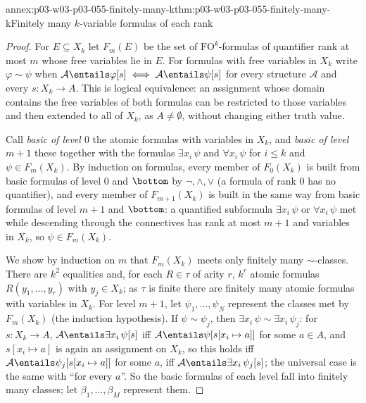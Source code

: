 \begin{annexitem}{annex:p03-w03-p03-055-finitely-many-k}{thm:p03-w03-p03-055-finitely-many-k}{Finitely many \(k\)-variable formulas of each rank}
\begin{proof}
For \(E\subseteq X_k\) let \(F_m(E)\) be the set of
\(\mathrm{FO}^k\)-formulas of quantifier rank at most \(m\) whose free
variables lie in \(E\). For formulas with free variables in \(X_k\) write
\(\varphi\sim\psi\) when \(\mathcal A\entails\varphi[s]\iff
\mathcal A\entails\psi[s]\) for every structure \(\mathcal A\) and every
\(s\colon X_k\to A\). This is logical equivalence: an assignment whose
domain contains the free variables of both formulas can be restricted to
those variables and then extended to all of \(X_k\), as \(A\neq\emptyset\),
without changing either truth value.

Call \emph{basic of level \(0\)} the atomic formulas with variables in
\(X_k\), and \emph{basic of level \(m+1\)} these together with the formulas
\(\exists x_i\,\psi\) and \(\forall x_i\,\psi\) for \(i\le k\) and
\(\psi\in F_m(X_k)\). By induction on formulas, every member of
\(F_0(X_k)\) is built from basic formulas of level \(0\) and \(\bottom\) by
\(\neg,\wedge,\vee\) (a formula of rank \(0\) has no quantifier), and every
member of \(F_{m+1}(X_k)\) is built in the same way from basic formulas of
level \(m+1\) and \(\bottom\): a quantified subformula
\(\exists x_i\,\psi\) or \(\forall x_i\,\psi\) met while descending through
the connectives has rank at most \(m+1\) and variables in \(X_k\), so
\(\psi\in F_m(X_k)\).

We show by induction on \(m\) that \(F_m(X_k)\) meets only finitely many
\(\sim\)-classes. There are \(k^2\) equalities and, for each
\(R\in\tau\) of arity \(r\), \(k^r\) atomic formulas \(R(y_1,\ldots,y_r)\)
with \(y_j\in X_k\); as \(\tau\) is finite there are finitely many atomic
formulas with variables in \(X_k\). For level \(m+1\), let
\(\psi_1,\ldots,\psi_N\) represent the classes met by \(F_m(X_k)\) (the
induction hypothesis). If \(\psi\sim\psi_j\), then
\(\exists x_i\,\psi\sim\exists x_i\,\psi_j\): for \(s\colon X_k\to A\),
\(\mathcal A\entails\exists x_i\,\psi[s]\) iff
\(\mathcal A\entails\psi[s[x_i\mapsto a]]\) for some \(a\in A\), and
\(s[x_i\mapsto a]\) is again an assignment on \(X_k\), so this holds iff
\(\mathcal A\entails\psi_j[s[x_i\mapsto a]]\) for some \(a\), iff
\(\mathcal A\entails\exists x_i\,\psi_j[s]\); the universal case is the same
with ``for every \(a\)''. So the basic formulas of each level fall into
finitely many classes; let \(\beta_1,\ldots,\beta_M\) represent them.


\end{proof}
\end{annexitem}
